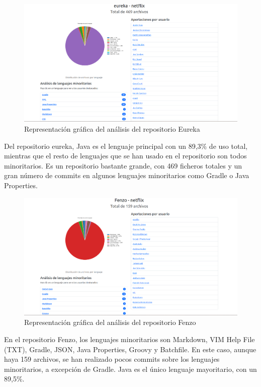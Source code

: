 \documentclass[a4paper, 12pt]{book}
\begin{document}
\begin{figure}[H]
  \centering
  \includegraphics[width=1\textwidth]{img/eureka.png}
  \caption{Representación gráfica del análisis del repositorio Eureka}
  \label{figura:analisiseureka}
\end{figure}

Del repositorio eureka, Java es el lenguaje principal con un 89,3\% de uso total, mientras que el resto de lenguajes que se han usado en el repositorio son todos minoritarios. Es un repositorio bastante grande, con 469 ficheros totales y un gran número de commits en algunos lenguajes minoritarios como Gradle o Java Properties.
\begin{figure}[H]
  \centering
  \includegraphics[width=1\textwidth]{img/fenzo.png}
  \caption{Representación gráfica del análisis del repositorio Fenzo}
  \label{figura:analisisfenzo}
\end{figure}

En el repositorio Fenzo, los lenguajes minoritarios son Markdown, VIM Help File (TXT), Gradle, JSON, Java Properties, Groovy y Batchfile. En este caso, aunque haya 159 archivos, se han realizado pocos commits sobre los lenguajes minoritarios, a excepción de Gradle. Java es el único lenguaje mayoritario, con un 89,5\%.
\end{document}
